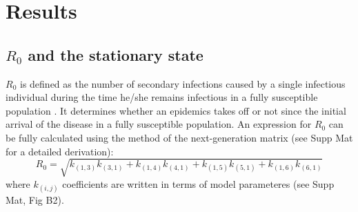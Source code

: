 \documentclass[preprint,12pt]{elsarticle}
\begin{document}
\section{Results}

\subsection{$R_0$ and the stationary state}
$R_0$ is defined as the number of secondary infections caused by a single infectious individual during the time he/she remains infectious in a fully susceptible population \citet{Anderson91}. It determines whether an epidemics takes off or not since the initial arrival of the disease in a fully susceptible population. An expression for $R_0$ can be fully calculated using the method of the next-generation matrix \cite{Diekmann2010} (see Supp Mat for a detailed derivation):
\begin{equation}
    R_0 = \sqrt{k_{(1,3)}k_{(3,1)} + k_{(1,4)}k_{(4,1)} + k_{(1,5)}k_{(5,1)} + k_{(1,6)}k_{(6,1)}}
    \label{eq:R_0}
\end{equation}
where $k_{(i,j)}$ coefficients are written in terms of model parameteres (see Supp Mat, Fig B2). 
\smallskip
\end{document}
